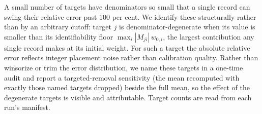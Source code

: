 A small number of targets have denominators so small that a single record can swing their relative error
past 100 per cent. We identify these structurally rather than by an arbitrary cutoff: target $j$ is
denominator-degenerate when its value is smaller than its identifiability floor
$\max_i |M_{ji}|\, w_{0,i}$, the largest contribution any single record makes at its initial weight. For
such a target the absolute relative error reflects integer placement noise rather than calibration
quality. Rather than winsorize or trim the error distribution, we name these targets in a one-time
audit and report a targeted-removal sensitivity (the mean recomputed with exactly those named targets
dropped) beside the full mean, so the effect of the degenerate targets is visible and attributable.
Target counts are read from each run's manifest.
